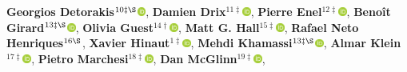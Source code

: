 \textbf{Georgios Detorakis}$^{10\ddagger\S}$\href{http://orcid.org/0000-0001-5891-1702}{\includegraphics[width=8pt]{orcid}},
\textbf{Damien Drix}$^{11\ddagger}$\href{http://orcid.org/0000-0003-4107-5693}{\includegraphics[width=8pt]{orcid}},
\textbf{Pierre Enel}$^{12\ddagger}$\href{http://orcid.org/0000-0001-8983-6223}{\includegraphics[width=8pt]{orcid}},
\textbf{Benoît Girard}$^{13\ddagger\S}$\href{http://orcid.org/0000-0002-8117-7064}{\includegraphics[width=8pt]{orcid}},
\textbf{Olivia Guest}$^{14\dagger}$\href{http://orcid.org/0000-0002-1891-0972}{\includegraphics[width=8pt]{orcid}},
\textbf{Matt G. Hall}$^{15\ddagger}$\href{http://orcid.org/0000-0002-9530-5477}{\includegraphics[width=8pt]{orcid}},
\textbf{Rafael Neto Henriques}$^{16\S}$,
\textbf{Xavier Hinaut}$^{1\ddagger}$\href{http://orcid.org/0000-0002-1924-1184}{\includegraphics[width=8pt]{orcid}},
\textbf{Mehdi Khamassi}$^{13\ddagger\S}$\href{http://orcid.org/0000-0002-2515-1046}{\includegraphics[width=8pt]{orcid}},
\textbf{Almar Klein}$^{17\ddagger}$\href{http://orcid.org/0000-0002-9978-2780}{\includegraphics[width=8pt]{orcid}},
\textbf{Pietro Marchesi}$^{18\ddagger}$\href{http://orcid.org/0000-0001-5955-6909}{\includegraphics[width=8pt]{orcid}},
\textbf{Dan McGlinn}$^{19\ddagger}$\href{http://orcid.org/0000-0003-2359-3526}{\includegraphics[width=8pt]{orcid}},
